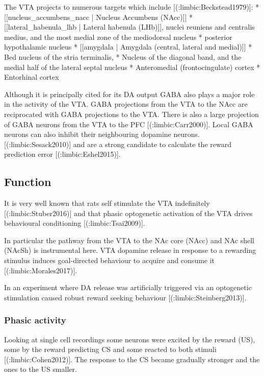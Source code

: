 {{The VTA projects to numerous targets which include [(:limbic:Beckstead1979)]:
  * [[nucleus_accumbens_nacc | Nucleus Accumbens (NAcc)]]
  * [[lateral_habenula_lhb | Lateral habenula (LHb)]], nuclei reuniens and centralis medius, and the most medial zone of the mediodorsal nucleus 
  * posterior hypothalamic nucleus 
  * [[amygdala | Amygdala (central, lateral and medial)]]
  * Bed nucleus of the stria terminalis, 
  * Nucleus of the diagonal band, and the medial half of the lateral septal nucleus
  * Anteromedial (frontocingulate) cortex
  * Entorhinal cortex

Although it is principally cited for its DA output GABA also plays a major role in the activity of the VTA. 
GABA projections from the VTA to the NAcc are reciprocated with GABA projections to the VTA. There is also a large projection of GABA neurons from the VTA to the PFC [(:limbic:Carr2000)]. Local GABA neurons can also inhibit their neighbouring dopamine neurons.[(:limbic:Sesack2010)] and are a strong candidate to calculate the reward prediction error [(:limbic:Eshel2015)].


\subsection{Function}

It is very well known that rats self stimulate the VTA indefinitely [(:limbic:Stuber2016)] and that phasic optogenetic activation of the VTA drives behavioural conditioning [(:limbic:Tsai2009)].

In particular the pathway from the VTA to the NAc core (NAcc) and NAc shell (NAcSh) is instrumental here. VTA dopamine release in response to a rewarding stimulus induces goal-directed behaviour to acquire and consume it [(:limbic:Morales2017)].

In an experiment where DA release was artificially triggered via an optogenetic stimulation caused robust reward seeking behaviour [(:limbic:Steinberg2013)].

\subsubsection{Phasic activity}

Looking at single cell recordings some neurons were excited by the reward (US), some by the reward predicting CS and some reacted to both stimuli [(:limbic:Cohen2012)]. The response to the CS became gradually stronger and the ones to the US smaller.

}}
